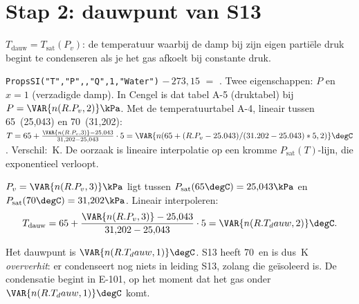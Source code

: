 \section{Stap 2: dauwpunt van S13}
\begin{methode}
$T_\mathrm{dauw} = T_\mathrm{sat}(P_v)$: de temperatuur waarbij de damp bij zijn eigen partiële druk begint te
condenseren als je het gas afkoelt bij constante druk.
\end{methode}
\begin{coolprop}
\texttt{PropsSI("T","P",,"Q",1,"Water")} $-\,273{,}15$ $=$ \textbf{\degC}.
Twee eigenschappen: $P$ en $x=1$ (verzadigde damp). In Cengel is dat tabel A-5 (druktabel) bij
$P = \VAR{n(R.P_v,2)}\kPa$. Met de temperatuurtabel A-4, lineair tussen 65\degC\ (25,043\kPa) en 70\degC\ (31,202\kPa):
$T = 65 + \frac{\VAR{n(R.P_v,3)}-25{,}043}{31{,}202-25{,}043}\cdot 5 = \VAR{n(65 + (R.P_v-25.043)/(31.202-25.043)*5,2)}\degC$.
Verschil: \,K. De oorzaak is lineaire interpolatie op
een kromme $P_\mathrm{sat}(T)$-lijn, die exponentieel verloopt.
\end{coolprop}
\begin{tabelkader}[A-4]
$P_v = \VAR{n(R.P_v,3)}\kPa$ ligt tussen $P_\mathrm{sat}(65\degC) = 25{,}043\kPa$ en $P_\mathrm{sat}(70\degC) = 31{,}202\kPa$.
Lineair interpoleren:
\[
T_\mathrm{dauw} = 65 + \frac{\VAR{n(R.P_v,3)} - 25{,}043}{31{,}202 - 25{,}043}\cdot 5 = \VAR{n(R.T_dauw,2)}\degC .
\]
\end{tabelkader}
\begin{resultaat}
Het dauwpunt is $\VAR{n(R.T_dauw,1)}\degC$. S13 heeft 70\degC\ en is dus \,K
\emph{oververhit}: er condenseert nog niets in leiding S13, zolang die geïsoleerd is. De condensatie begint in
E-101, op het moment dat het gas onder $\VAR{n(R.T_dauw,1)}\degC$ komt.
\end{resultaat}

